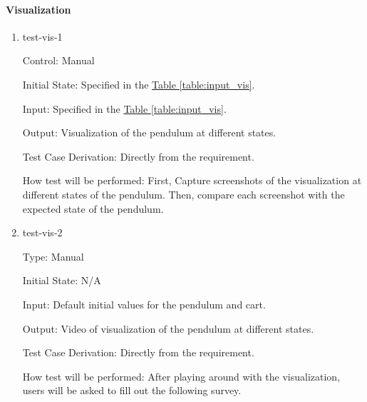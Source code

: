 \documentclass[12pt, titlepage]{article}
\begin{document}
\paragraph{Visualization}

\begin{enumerate}

  \item{test-vis-1\\}

        Control: Manual

        Initial State: Specified in the \hyperref[table:input_vis]{Table \ref*{table:input_vis}}.

        Input: Specified in the \hyperref[table:input_vis]{Table \ref*{table:input_vis}}.

        Output: Visualization of the pendulum at different states.

        Test Case Derivation: Directly from the requirement.

        How test will be performed: First, Capture screenshots of the visualization
        at different states of the pendulum. Then, compare each screenshot with
        the expected state of the pendulum.

  \item{test-vis-2\\}

        Type: Manual

        Initial State: N/A


        Input: Default initial values for the pendulum and cart.

        Output: Video of visualization of the pendulum at different states.

        Test Case Derivation: Directly from the requirement.

        How test will be performed: After playing around with the visualization,
        users will be asked to fill out the following survey.


\end{enumerate}
\end{document}
